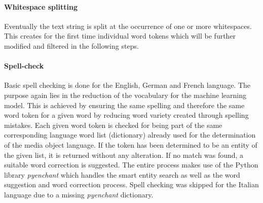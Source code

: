 \paragraph*{Whitespace splitting} \label{whitespace_splitting}
Eventually the text string is split at the occurrence of one or more whitespaces. This creates for the first time individual word tokens which will be further modified and filtered in the following steps.

\paragraph*{Spell-check} \label{spell_check}
Basic spell checking is done for the English, German and French language. The purpose again lies in the reduction of the vocabulary for the machine learning model. This is achieved by ensuring the same spelling and therefore the same word token for a given word by reducing word variety created through spelling mistakes. Each given word token is checked for being part of the same corresponding language word list (dictionary) already used for the determination of the media object language. If the token has been determined to be an entity of the given list, it is returned without any alteration. If no match was found, a suitable word correction is suggested. The entire process makes use of the Python library \textit{pyenchant} which handles the smart entity search as well as the word suggestion and word correction process. Spell checking was skipped for the Italian language due to a missing \textit{pyenchant} dictionary.

